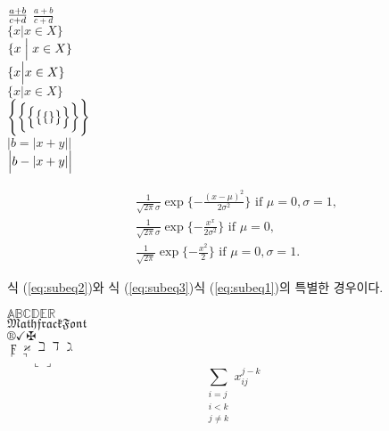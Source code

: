 \documentclass[11pt]{article}
\begin{document}
${a+b \over c+d}$ $\frac{a+b}{c+d}$ \\

$\{ x\Big | x\in X\}$ \\

$\{x\Bigm | x\in X\}$ \\

$\{x \Bigl | x\in X\}$ \\

$\{x \Bigr | x\in X\}$ \\

$\Biggl \{ \biggl \{ \Bigl \{ \bigl \{ \{ \} \bigr \} \Bigr \} \biggr \} \Biggr \}$ \\

$|b=|x+y||$ \\

$\Bigl | b-|x+y| \Bigr |$


\begin{subequations}
\begin{align}
& \frac{1}{\sqrt{2\pi}\sigma}\exp\{-\frac{(x-\mu)^2}{2\sigma^2}\}\mbox{ if } \mu=0, \sigma=1, \label{eq:subeq1} \\
& \frac{1}{\sqrt{2\pi}\sigma}\exp\{-\frac{x^x}{2\sigma^2}\}\mbox{ if } \mu=0, \label{eq:subeq2} \\
& \frac{1}{\sqrt{2\pi}} \exp\{-\frac{x^2}{2}\} \mbox{ if } \mu=0, \sigma=1. \label{eq:subeq3}
\end{align}
\end{subequations}

식 (\ref{eq:subeq2})와 식 (\ref{eq:subeq3})\는 식 (\ref{eq:subeq1})의 특별한 경우이다.

$\mathbb{A B C D E R}$ \\

$\mathfrak{Mathfrack Font}$ \\

$\circledR \checkmark \maltese$ \\

$\digamma \varkappa \beth \daleth \gimel$ \\

$\ulcorner \urcorner \llcorner \lrcorner$ \\

$$\sum_{\substack{i=j\\ i<k \\ j\neq k}}x_{ij}^{j-k}$$
\end{document}
